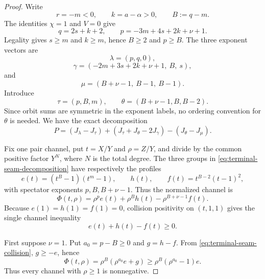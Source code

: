 \documentclass[11pt]{article}
\theoremstyle{definition}
\begin{document}
\begin{proof}
Write
\begin{equation*}
r=-m<0,
\qquad
k=a-\alpha>0,
\qquad
B:=q-m.
\end{equation*}
The identities \(\chi=1\) and \(V=0\) give
\begin{equation*}
q=2s+k+2,
\qquad
p=-3m+4s+2k+\nu+1.
\end{equation*}
Legality gives \(s\ge m\) and \(k\ge m\), hence \(B\ge2\) and \(p\ge B\).  The three exponent vectors are
\begin{equation*}
\lambda=(p,q,0),
\end{equation*}
\begin{equation*}
\gamma=(-2m+3s+2k+\nu+1,\ B,\ s),
\end{equation*}
and
\begin{equation*}
\mu=(B+\nu-1,\ B-1,\ B-1).
\end{equation*}
Introduce
\begin{equation*}
\tau=(p,B,m),
\qquad
\theta=(B+\nu-1,B,B-2).
\end{equation*}
Since orbit sums are symmetric in the exponent labels, no ordering convention for \(\theta\) is needed.  We have the exact decomposition
\begin{equation}\label{eq:terminal-seam-decomposition}
P=(J_\lambda-J_\tau)
 +(J_\tau+J_\theta-2J_\gamma)
 -(J_\theta-J_\mu).
\end{equation}

Fix one pair channel, put \(t=X/Y\) and \(\rho=Z/Y\), and divide by the common positive factor \(Y^N\), where \(N\) is the total degree.  The three groups in \eqref{eq:terminal-seam-decomposition} have respectively the profiles
\begin{equation*}
e(t)=(t^B-1)(t^m-1),
\qquad
h(t),
\qquad
f(t)=t^{B-2}(t-1)^2,
\end{equation*}
with spectator exponents \(p,B,B+\nu-1\).  Thus the normalized channel is
\begin{equation}\label{eq:terminal-seam-channel}
\Phi(t,\rho)
 =\rho^p e(t)+\rho^B h(t)-\rho^{B+\nu-1}f(t).
\end{equation}
Because \(e(1)=h(1)=f(1)=0\), collision positivity on \((t,1,1)\) gives the single channel inequality
\begin{equation}\label{eq:terminal-seam-collision}
e(t)+h(t)-f(t)\ge0.
\end{equation}

First suppose \(\nu=1\).  Put \(a_0=p-B\ge0\) and \(g=h-f\).  From \eqref{eq:terminal-seam-collision}, \(g\ge-e\), hence
\begin{equation*}
\Phi(t,\rho)
 =\rho^B(\rho^{a_0}e+g)
 \ge \rho^B(\rho^{a_0}-1)e.
\end{equation*}
Thus every channel with \(\rho\ge1\) is nonnegative.


\end{proof}
\end{document}
